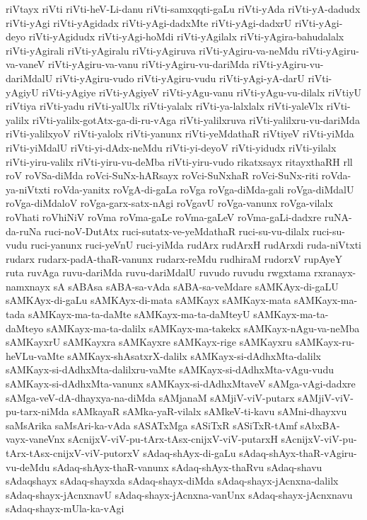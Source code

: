 {riVtayx
riVti
riVti-heV-Li-danu
riVti-samxqqti-gaLu
riVti-yAda
riVti-yA-dadudx
riVti-yAgi
riVti-yAgidadx
riVti-yAgi-dadxMte
riVti-yAgi-dadxrU
riVti-yAgi-deyo
riVti-yAgidudx
riVti-yAgi-hoMdi
riVti-yAgilalx
riVti-yAgira-bahudalalx
riVti-yAgirali
riVti-yAgiralu
riVti-yAgiruva
riVti-yAgiru-va-neMdu
riVti-yAgiru-va-vaneV
riVti-yAgiru-va-vanu
riVti-yAgiru-vu-dariMda
riVti-yAgiru-vu-dariMdalU
riVti-yAgiru-vudo
riVti-yAgiru-vudu
riVti-yAgi-yA-darU
riVti-yAgiyU
riVti-yAgiye
riVti-yAgiyeV
riVti-yAgu-vanu
riVti-yAgu-vu-dilalx
riVtiyU
riVtiya
riVti-yadu
riVti-yalUlx
riVti-yalalx
riVti-ya-lalxlalx
riVti-yaleVlx
riVti-yalilx
riVti-yalilx-gotAtx-ga-di-ru-vAga
riVti-yalilxruva
riVti-yalilxru-vu-dariMda
riVti-yalilxyoV
riVti-yalolx
riVti-yanunx
riVti-yeMdathaR
riVtiyeV
riVti-yiMda
riVti-yiMdalU
riVti-yi-dAdx-neMdu
riVti-yi-deyoV
riVti-yidudx
riVti-yilalx
riVti-yiru-valilx
riVti-yiru-vu-deMba
riVti-yiru-vudo
rikatxsayx
ritayxthaRH
rll
roV
roVSa-diMda
roVci-SuNx-hARsayx
roVci-SuNxhaR
roVci-SuNx-riti
roVda-ya-niVtxti
roVda-yanitx
roVgA-di-gaLa
roVga
roVga-diMda-gali
roVga-diMdalU
roVga-diMdaloV
roVga-garx-satx-nAgi
roVgavU
roVga-vanunx
roVga-vilalx
roVhati
roVhiNiV
roVma
roVma-gaLe
roVma-gaLeV
roVma-gaLi-dadxre
ruNA-da-ruNa
ruci-noV-DutAtx
ruci-sutatx-ve-yeMdathaR
ruci-su-vu-dilalx
ruci-su-vudu
ruci-yanunx
ruci-yeVnU
ruci-yiMda
rudArx
rudArxH
rudArxdi
ruda-niVtxti
rudarx
rudarx-padA-thaR-vanunx
rudarx-reMdu
rudhiraM
rudorxV
rupAyeY
ruta
ruvAga
ruvu-dariMda
ruvu-dariMdalU
ruvudo
ruvudu
rwgxtama
rxranayx-namxnayx
sA
sABAsa
sABA-sa-vAda
sABA-sa-veMdare
sAMKAyx-di-gaLU
sAMKAyx-di-gaLu
sAMKAyx-di-mata
sAMKayx
sAMKayx-mata
sAMKayx-ma-tada
sAMKayx-ma-ta-daMte
sAMKayx-ma-ta-daMteyU
sAMKayx-ma-ta-daMteyo
sAMKayx-ma-ta-dalilx
sAMKayx-ma-takekx
sAMKayx-nAgu-va-neMba
sAMKayxrU
sAMKayxra
sAMKayxre
sAMKayx-rige
sAMKayxru
sAMKayx-ru-heVLu-vaMte
sAMKayx-shAsatxrX-dalilx
sAMKayx-si-dAdhxMta-dalilx
sAMKayx-si-dAdhxMta-dalilxru-vaMte
sAMKayx-si-dAdhxMta-vAgu-vudu
sAMKayx-si-dAdhxMta-vanunx
sAMKayx-si-dAdhxMtaveV
sAMga-vAgi-dadxre
sAMga-veV-dA-dhayxya-na-diMda
sAMjanaM
sAMjiV-viV-putarx
sAMjiV-viV-pu-tarx-niMda
sAMkayaR
sAMka-yaR-vilalx
sAMkeV-ti-kavu
sAMni-dhayxvu
saMsArika
saMsAri-ka-vAda
sASATxMga
sASiTxR
sASiTxR-tAmf
sAbxBA-vayx-vaneVnx
sAcnijxV-viV-pu-tArx-tAsx-cnijxV-viV-putarxH
sAcnijxV-viV-pu-tArx-tAsx-cnijxV-viV-putorxV
sAdaq-shAyx-di-gaLu
sAdaq-shAyx-thaR-vAgiru-vu-deMdu
sAdaq-shAyx-thaR-vanunx
sAdaq-shAyx-thaRvu
sAdaq-shavu
sAdaqshayx
sAdaq-shayxda
sAdaq-shayx-diMda
sAdaq-shayx-jAcnxna-dalilx
sAdaq-shayx-jAcnxnavU
sAdaq-shayx-jAcnxna-vanUnx
sAdaq-shayx-jAcnxnavu
sAdaq-shayx-mUla-ka-vAgi
}
